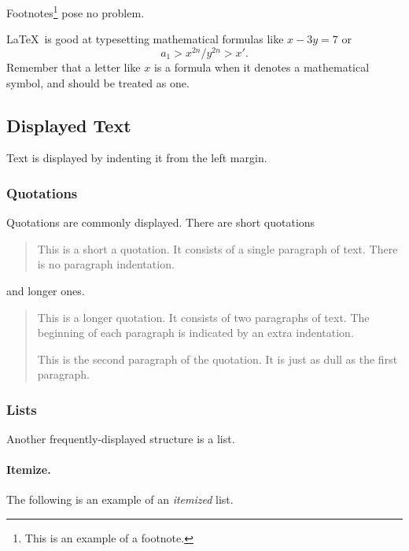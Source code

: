 Footnotes\footnote{This is an example of a footnote.}
pose no problem.

\LaTeX\ is good at typesetting mathematical formulas like
       $ x-3y = 7 $
or
       $$ a_{1} > x^{2n} / y^{2n} > x'. $$
Remember that a letter like
       $x$        %
is a formula when it denotes a mathematical symbol, and should
be treated as one.

\subsection{Displayed Text}

Text is displayed by indenting it from the left margin.

\subsubsection{Quotations}

Quotations are commonly displayed.  There are short quotations
\begin{quote}
   This is a short a quotation.  It consists of a
   single paragraph of text.  There is no paragraph
   indentation.
\end{quote}
and longer ones.
\begin{quotation}
   This is a longer quotation.  It consists of two paragraphs
   of text.  The beginning of each paragraph is indicated
   by an extra indentation.

   This is the second paragraph of the quotation.  It is just
   as dull as the first paragraph.
\end{quotation}

\subsubsection{Lists}

Another frequently-displayed structure is a list.

\paragraph{Itemize.}
The following is an example of an {\em itemized} list.


